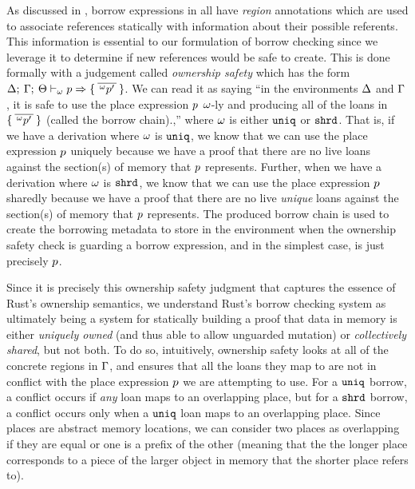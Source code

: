 As discussed in , borrow expressions in \lang all have
\emph{region} annotations which are used to associate references statically with
information about their possible referents. This information is essential to our
formulation of borrow checking since we leverage it to determine if new
references would be safe to create. This is done formally with a judgement
called \emph{ownership safety} which has the form $ \Delta; \: \Gamma; \: \Theta \vdash_{\omega} p \Rightarrow  \{ \: \overline{\,^{\omega}p^\prime\,} \: \}  $. We can
read it as saying ``in the environments $\Delta$ and $\Gamma$, it is safe
to use the place expression $p$ $\omega$-ly and producing all of the
loans in $\{ \: \overline{\,^{\omega}p^\prime\,} \: \}$ (called
the borrow chain).,'' where $\omega$ is either $\mathtt{uniq}$ or $\mathtt{shrd}$. That is,
if we have a derivation where $\omega$ is $\mathtt{uniq}$, we know that we can use the
place expression $p$ uniquely because we have a proof that there are
no live loans against the section(s) of memory that $p$ represents.
Further, when we have a derivation where $\omega$ is $\mathtt{shrd}$, we know that we
can use the place expression $p$ sharedly because we have a proof
that there are no live \emph{unique} loans against the section(s) of memory that
$p$ represents. The produced borrow chain is used to create the
borrowing metadata to store in the environment when the ownership safety check
is guarding a borrow expression, and in the simplest case, is just precisely
$p$.

Since it is precisely this ownership safety judgment that captures the essence
of Rust's ownership semantics, we understand Rust's borrow checking system as
ultimately being a system for statically building a proof that data in memory is
either \emph{uniquely owned} (and thus able to allow unguarded mutation) or
\emph{collectively shared}, but not both. To do so, intuitively, ownership
safety looks at all of the concrete regions in $\Gamma$, and ensures that all
the loans they map to are not in conflict with the place expression
$p$ we are attempting to use. For a $\mathtt{uniq}$ borrow, a conflict
occurs if \emph{any} loan maps to an overlapping place, but for a $\mathtt{shrd}$
borrow, a conflict occurs only when a $\mathtt{uniq}$ loan maps to an overlapping
place. Since places are abstract memory locations, we can consider two places as
overlapping if they are equal or one is a prefix of the other (meaning that the
the longer place corresponds to a piece of the larger object in memory that the
shorter place refers to).

